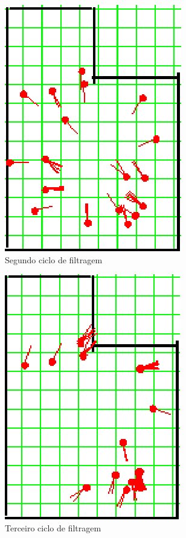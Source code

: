 \begin{figure}[H]
  \centering
  \includegraphics[scale=1]{figuras/cen4_ex5/3.eps}
  \caption[Segundo Ciclo de Filtragem]{Segundo ciclo de filtragem}
  \label{img:cen4_ex5_3}
\end{figure}

\begin{figure}[H]
  \centering
  \includegraphics[scale=1]{figuras/cen4_ex5/4.eps}
  \caption[Terceiro Ciclo de Filtragem]{Terceiro ciclo de filtragem}
  \label{img:cen4_ex5_4}
\end{figure}

